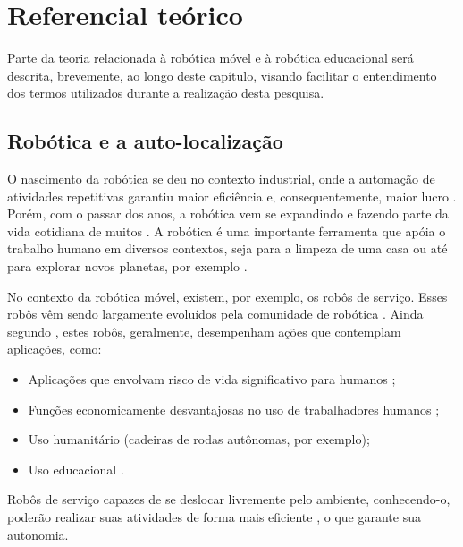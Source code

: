 
\chapter[Referencial Teórico]{Referencial teórico}

	Parte da teoria relacionada à robótica móvel e à robótica educacional será descrita, brevemente, ao longo deste capítulo, visando facilitar o entendimento dos termos utilizados durante a realização desta pesquisa.

\section{Robótica e a auto-localização}

O nascimento da robótica se deu no contexto industrial, onde a automação de atividades repetitivas garantiu maior eficiência e, consequentemente, maior lucro \cite{roboticaIndustrial}. Porém, com o passar dos anos, a robótica vem se expandindo e fazendo parte da vida cotidiana de muitos \cite{teachingWithRoboticKit}. A robótica é uma importante ferramenta que apóia o trabalho humano em diversos contextos, seja para a limpeza de uma casa \cite{melhoramentoServicoLimpeza} ou até para explorar novos planetas, por exemplo \sloppy \cite{explore_marte}.

No contexto da robótica móvel, existem, por exemplo, os robôs de serviço. Esses robôs vêm sendo largamente evoluídos pela comunidade de robótica \cite{theCleaningProject}. Ainda segundo \cite{theCleaningProject}, estes robôs, geralmente, desempenham ações que contemplam aplicações, como:

\begin{itemize}
	\item Aplicações que envolvam risco de vida significativo para humanos \cite{explore_marte};
	\item Funções economicamente desvantajosas no uso de trabalhadores humanos \cite{roboticaIndustrial};
	\item Uso humanitário (cadeiras de rodas autônomas, por exemplo);
	\item Uso educacional \cite{teachingToolsState_Art}.
\end{itemize}

Robôs de serviço capazes de se deslocar livremente pelo ambiente, conhecendo-o, poderão realizar suas atividades de forma mais eficiente \cite{theCleaningProject}, o que garante sua autonomia.

